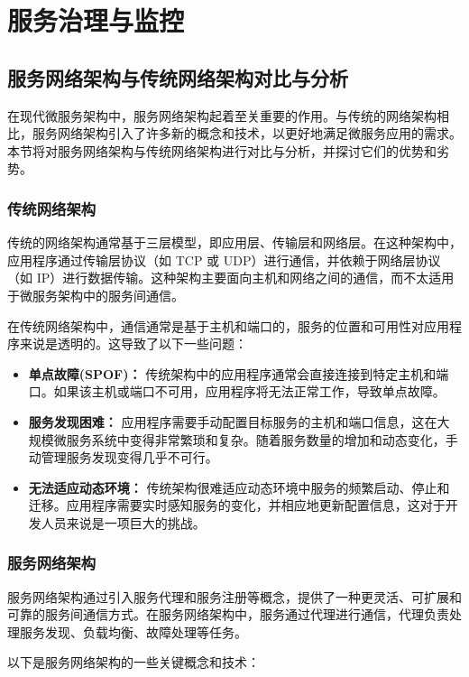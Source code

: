 \chapter{服务治理与监控}
\section{服务网络架构与传统网络架构对比与分析}
在现代微服务架构中，服务网络架构起着至关重要的作用。与传统的网络架构相比，服务网络架构引入了许多新的概念和技术，以更好地满足微服务应用的需求。本节将对服务网络架构与传统网络架构进行对比与分析，并探讨它们的优势和劣势。

\subsection{传统网络架构}

传统的网络架构通常基于三层模型，即应用层、传输层和网络层。在这种架构中，应用程序通过传输层协议（如 TCP 或 UDP）进行通信，并依赖于网络层协议（如 IP）进行数据传输。这种架构主要面向主机和网络之间的通信，而不太适用于微服务架构中的服务间通信。

在传统网络架构中，通信通常是基于主机和端口的，服务的位置和可用性对应用程序来说是透明的。这导致了以下一些问题：

\begin{itemize}
	\item \textbf{单点故障(SPOF)：} 传统架构中的应用程序通常会直接连接到特定主机和端口。如果该主机或端口不可用，应用程序将无法正常工作，导致单点故障。
	\item \textbf{服务发现困难： }应用程序需要手动配置目标服务的主机和端口信息，这在大规模微服务系统中变得非常繁琐和复杂。随着服务数量的增加和动态变化，手动管理服务发现变得几乎不可行。
	\item \textbf{无法适应动态环境：} 传统架构很难适应动态环境中服务的频繁启动、停止和迁移。应用程序需要实时感知服务的变化，并相应地更新配置信息，这对于开发人员来说是一项巨大的挑战。
\end{itemize}

\subsection{服务网络架构}

服务网络架构通过引入服务代理和服务注册等概念，提供了一种更灵活、可扩展和可靠的服务间通信方式。在服务网络架构中，服务通过代理进行通信，代理负责处理服务发现、负载均衡、故障处理等任务。

以下是服务网络架构的一些关键概念和技术：

